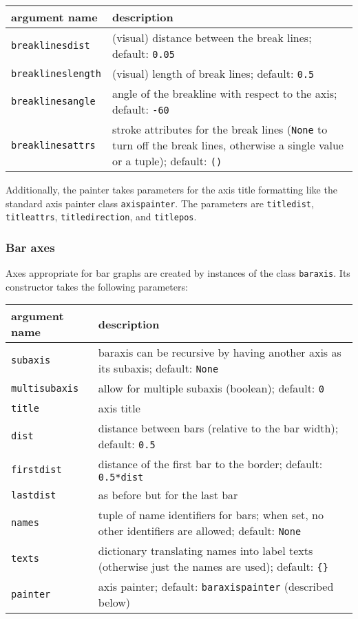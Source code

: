 \medskip
\begin{tabularx}{\linewidth}{l>{\raggedright\arraybackslash}X}
argument name&description\\
\hline
\texttt{breaklinesdist}&(visual) distance between the break lines; default: \texttt{0.05}\\
\texttt{breaklineslength}&(visual) length of break lines; default: \texttt{0.5}\\
\texttt{breaklinesangle}&angle of the breakline with respect to the axis; default: \texttt{-60}\\
\texttt{breaklinesattrs}&stroke attributes for the break lines (\texttt{None} to turn off the break lines, otherwise a single value or a tuple); default: \texttt{()}\\
\end{tabularx}

Additionally, the painter takes parameters for the axis title
formatting like the standard axis painter class \verb|axispainter|.
The parameters are \verb|titledist|, \verb|titleattrs|,
\verb|titledirection|, and \verb|titlepos|.

\subsubsection{Bar axes}

Axes appropriate for bar graphs are created by instances of the class
\verb|baraxis|. Its constructor takes the following parameters:

\medskip
\begin{tabularx}{\linewidth}{l>{\raggedright\arraybackslash}X}
argument name&description\\
\hline
\texttt{subaxis}&baraxis can be recursive by having another axis as its subaxis; default: \texttt{None}\\
\texttt{multisubaxis}&allow for multiple subaxis (boolean); default: \texttt{0}\\
\texttt{title}&axis title\\
\texttt{dist}&distance between bars (relative to the bar width); default: \texttt{0.5}\\
\texttt{firstdist}&distance of the first bar to the border; default: \texttt{0.5*dist}\\
\texttt{lastdist}&as before but for the last bar\\
\texttt{names}&tuple of name identifiers for bars; when set, no other identifiers are allowed; default: \texttt{None}\\
\texttt{texts}&dictionary translating names into label texts (otherwise just the names are used); default: \texttt{\{\}}\\
\texttt{painter}&axis painter; default: \texttt{baraxispainter} (described below)\\
\end{tabularx}
\medskip

